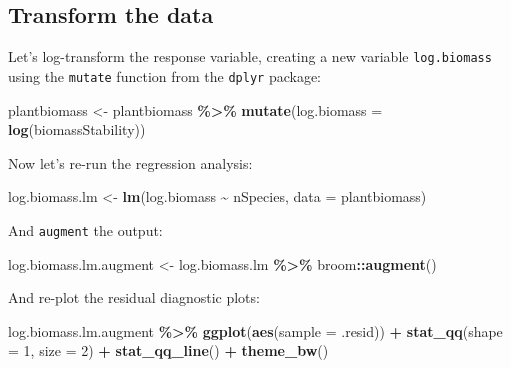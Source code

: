 \documentclass[
]{book}
\newenvironment{Shaded}{\begin{snugshade}}{\end{snugshade}}
\newcommand{\AttributeTok}[1]{\textcolor[rgb]{0.13,0.29,0.53}{#1}}
\newcommand{\DecValTok}[1]{\textcolor[rgb]{0.00,0.00,0.81}{#1}}
\newcommand{\FunctionTok}[1]{\textcolor[rgb]{0.13,0.29,0.53}{\textbf{#1}}}
\newcommand{\NormalTok}[1]{#1}
\newcommand{\OtherTok}[1]{\textcolor[rgb]{0.56,0.35,0.01}{#1}}
\newcommand{\SpecialCharTok}[1]{\textcolor[rgb]{0.81,0.36,0.00}{\textbf{#1}}}
\begin{document}
\subsection{Transform the data}\label{transform-the-data}

Let's log-transform the response variable, creating a new variable \texttt{log.biomass} using the \texttt{mutate} function from the \texttt{dplyr} package:

\begin{Shaded}
\begin{Highlighting}[]
\NormalTok{plantbiomass }\OtherTok{\textless{}{-}}\NormalTok{ plantbiomass }\SpecialCharTok{\%\textgreater{}\%}
  \FunctionTok{mutate}\NormalTok{(}\AttributeTok{log.biomass =} \FunctionTok{log}\NormalTok{(biomassStability))}
\end{Highlighting}
\end{Shaded}

Now let's re-run the regression analysis:

\begin{Shaded}
\begin{Highlighting}[]
\NormalTok{log.biomass.lm }\OtherTok{\textless{}{-}} \FunctionTok{lm}\NormalTok{(log.biomass }\SpecialCharTok{\textasciitilde{}}\NormalTok{ nSpecies, }\AttributeTok{data =}\NormalTok{ plantbiomass)}
\end{Highlighting}
\end{Shaded}

And \texttt{augment} the output:

\begin{Shaded}
\begin{Highlighting}[]
\NormalTok{log.biomass.lm.augment }\OtherTok{\textless{}{-}}\NormalTok{ log.biomass.lm }\SpecialCharTok{\%\textgreater{}\%}
\NormalTok{  broom}\SpecialCharTok{::}\FunctionTok{augment}\NormalTok{()}
\end{Highlighting}
\end{Shaded}

And re-plot the residual diagnostic plots:

\begin{Shaded}
\begin{Highlighting}[]
\NormalTok{log.biomass.lm.augment }\SpecialCharTok{\%\textgreater{}\%}
  \FunctionTok{ggplot}\NormalTok{(}\FunctionTok{aes}\NormalTok{(}\AttributeTok{sample =}\NormalTok{ .resid)) }\SpecialCharTok{+}
  \FunctionTok{stat\_qq}\NormalTok{(}\AttributeTok{shape =} \DecValTok{1}\NormalTok{, }\AttributeTok{size =} \DecValTok{2}\NormalTok{) }\SpecialCharTok{+}
  \FunctionTok{stat\_qq\_line}\NormalTok{() }\SpecialCharTok{+}
  \FunctionTok{theme\_bw}\NormalTok{()}
\end{Highlighting}
\end{Shaded}
\end{document}
